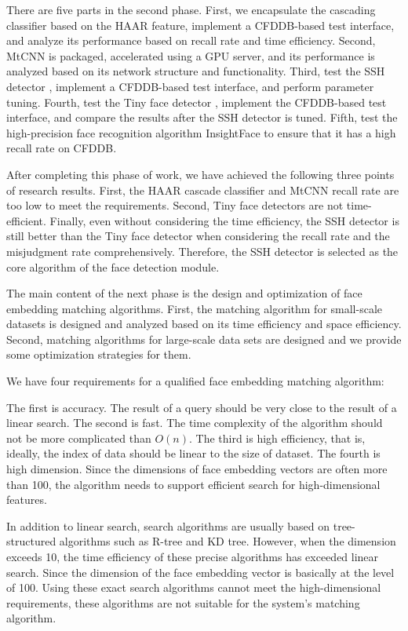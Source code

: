 \begin{bigabstract}
There are five parts in the second phase. First, we encapsulate the cascading classifier \cite{viola2004robust} based on the HAAR feature, implement a CFDDB-based test interface, and analyze its performance based on recall rate and time efficiency. Second, MtCNN\cite{zhang2016joint} is packaged, accelerated using a GPU server, and its performance is analyzed based on its network structure and functionality. Third, test the SSH detector \cite{najibi2017ssh}, implement a CFDDB-based test interface, and perform parameter tuning. Fourth, test the Tiny face detector \cite{hu2017finding}, implement the CFDDB-based test interface, and compare the results after the SSH detector is tuned. Fifth, test the high-precision face recognition algorithm InsightFace\cite{deng2018arcface} to ensure that it has a high recall rate on CFDDB.

After completing this phase of work, we have achieved the following three points of research results. First, the HAAR cascade classifier and MtCNN recall rate are too low to meet the requirements. Second, Tiny face detectors are not time-efficient. Finally, even without considering the time efficiency, the SSH detector is still better than the Tiny face detector when considering the recall rate and the misjudgment rate comprehensively. Therefore, the SSH detector is selected as the core algorithm of the face detection module.

The main content of the next phase is the design and optimization of face embedding matching algorithms. First, the matching algorithm for small-scale datasets is designed and analyzed based on its time efficiency and space efficiency. Second, matching algorithms for large-scale data sets are designed and we provide some optimization strategies for them.

We have four requirements for a qualified face embedding matching algorithm:

The first is accuracy. The result of a query should be very close to the result of a linear search. The second is fast. The time complexity of the algorithm should not be more complicated than $O(n)$. The third is high efficiency, that is, ideally, the index of data should be linear to the size of dataset. The fourth is high dimension. Since the dimensions of face embedding vectors are often more than 100, the algorithm needs to support efficient search for high-dimensional features.

In addition to linear search, search algorithms are usually based on tree-structured algorithms such as R-tree and KD tree. However, when the dimension exceeds 10, the time efficiency of these precise algorithms has exceeded linear search\cite{weber1998quantitative}. Since the dimension of the face embedding vector is basically at the level of 100. Using these exact search algorithms cannot meet the high-dimensional requirements, these algorithms are not suitable for the system's matching algorithm.


\end{bigabstract}
